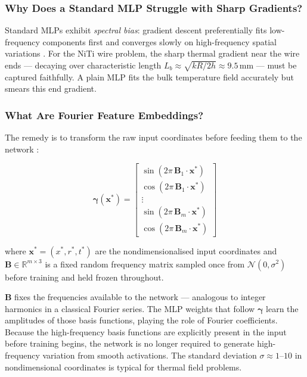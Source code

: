 \documentclass[12pt, a4paper]{article}
\begin{document}
\subsubsection{Why Does a Standard MLP Struggle with Sharp Gradients?}

Standard MLPs exhibit \emph{spectral bias}: gradient descent preferentially fits
low-frequency components first and converges slowly on high-frequency spatial
variations \citep{tancik2020}. For the NiTi wire problem, the sharp thermal
gradient near the wire ends — decaying over characteristic length
$L_b \approx \sqrt{kR/2h} \approx 9.5\,\text{mm}$ — must be captured faithfully.
A plain MLP fits the bulk temperature field accurately but smears this end gradient.

\subsubsection{What Are Fourier Feature Embeddings?}

The remedy is to transform the raw input coordinates before feeding them to the
network \citep{tancik2020}:

\begin{equation}
    \boldsymbol{\gamma}(\mathbf{x}^*)
    =
    \begin{bmatrix}
        \sin(2\pi\,\mathbf{B}_1 \cdot \mathbf{x}^*)\\
        \cos(2\pi\,\mathbf{B}_1 \cdot \mathbf{x}^*)\\
        \vdots\\
        \sin(2\pi\,\mathbf{B}_m \cdot \mathbf{x}^*)\\
        \cos(2\pi\,\mathbf{B}_m \cdot \mathbf{x}^*)
    \end{bmatrix}
    \label{eq:ffe}
\end{equation}

where $\mathbf{x}^* = (x^*, r^*, t^*)$ are the nondimensionalised input
coordinates and $\mathbf{B} \in \mathbb{R}^{m \times 3}$ is a fixed random
frequency matrix sampled once from $\mathcal{N}(0, \sigma^2)$ before training
and held frozen throughout.

$\mathbf{B}$ fixes the frequencies available to the network — analogous to
integer harmonics in a classical Fourier series. The MLP weights that follow
$\boldsymbol{\gamma}$ learn the amplitudes of those basis functions, playing the
role of Fourier coefficients. Because the high-frequency basis functions are
explicitly present in the input before training begins, the network is no longer
required to generate high-frequency variation from smooth activations. The standard
deviation $\sigma \approx 1$--$10$ in nondimensional coordinates is typical for
thermal field problems.
\end{document}
